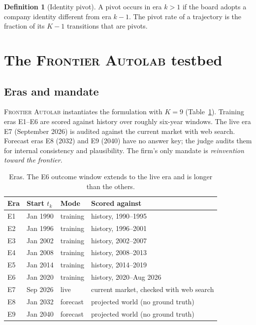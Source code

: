 \documentclass[11pt]{article}
\theoremstyle{definition}
\newtheorem{definition}{Definition}
\newcommand{\sys}{\textsc{Frontier Autolab}}
\begin{document}
\begin{definition}[Identity pivot]
A pivot occurs in era $k>1$ if the board adopts a company identity different from era $k-1$. The pivot rate of a trajectory is the fraction of its $K-1$ transitions that are pivots.
\end{definition}

\section{The \sys{} testbed}
\label{sec:system}

\subsection{Eras and mandate}

\sys{} instantiates the formulation with $K=9$ (Table~\ref{tab:eras}). Training eras E1--E6 are scored against history over roughly six-year windows. The live era E7 (September 2026) is audited against the current market with web search. Forecast eras E8 (2032) and E9 (2040) have no answer key; the judge audits them for internal consistency and plausibility. The firm's only mandate is \emph{reinvention toward the frontier}.

\begin{table}[t]
\centering
\small
\caption{Eras. The E6 outcome window extends to the live era and is longer than the others.}
\label{tab:eras}
\begin{tabular}{llll}
\toprule
Era & Start $t_k$ & Mode & Scored against \\
\midrule
E1 & Jan 1990 & training & history, 1990--1995 \\
E2 & Jan 1996 & training & history, 1996--2001 \\
E3 & Jan 2002 & training & history, 2002--2007 \\
E4 & Jan 2008 & training & history, 2008--2013 \\
E5 & Jan 2014 & training & history, 2014--2019 \\
E6 & Jan 2020 & training & history, 2020--Aug 2026 \\
E7 & Sep 2026 & live & current market, checked with web search \\
E8 & Jan 2032 & forecast & projected world (no ground truth) \\
E9 & Jan 2040 & forecast & projected world (no ground truth) \\
\bottomrule
\end{tabular}
\end{table}
\end{document}
